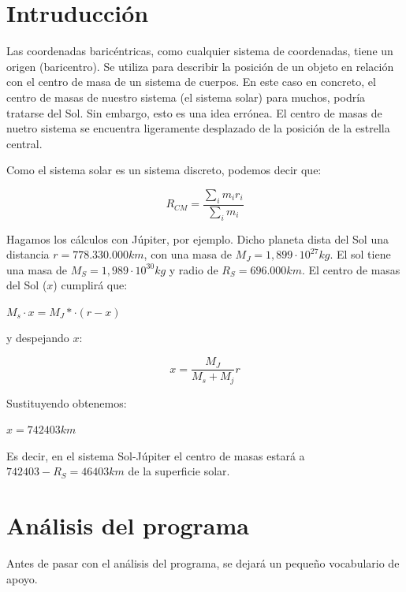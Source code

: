 \documentclass[12pt]{article}
\begin{document}
\section{Intruducción}
Las coordenadas baricéntricas, como cualquier sistema de coordenadas, tiene
un origen (baricentro). Se utiliza para describir la posición de un objeto en
relación con el centro de masa de un sistema de cuerpos. 
En este caso en concreto, el centro de masas de nuestro sistema (el sistema solar) 
para muchos, podría tratarse del Sol. Sin embargo, esto es una
idea errónea. El centro de masas de nuetro sistema se encuentra 
ligeramente desplazado de la posición de la estrella central. 

\vspace{5mm}

Como el sistema solar es un sistema discreto, podemos decir que:

\begin{equation}
    R_{CM}=\frac{\sum_i m_ir_i}{\sum_i m_i}
    \label{eq1}
\end{equation}

Hagamos los cálculos con Júpiter, por ejemplo. Dicho planeta dista del Sol una 
distancia $r =  778.330.000 km$, con una masa de $M_J = 1,899 \cdot 10^{27} kg$.
El sol tiene una masa de $M_S = 1,989 \cdot 10^{30} kg$ y radio de $R_S = 696.000 km$.
El centro de masas del Sol ($x$) cumplirá que:

\begin{center}
    $M_s \cdot x = M_J *\cdot(r-x)$
\end{center}

y despejando $x$:

\begin{equation}
    x = \frac{M_J}{M_s + M_j}r
\end{equation}

Sustituyendo obtenemos:

\begin{center}
    $x = 742403 km$
\end{center}

Es decir, en el sistema Sol-Júpiter el centro de masas estará a $742403 - R_S = 46403 km$ de la superficie solar.

\newpage


\section{Análisis del programa}
Antes de pasar con el análisis del programa, se dejará un pequeño vocabulario
de apoyo.
\end{document}
